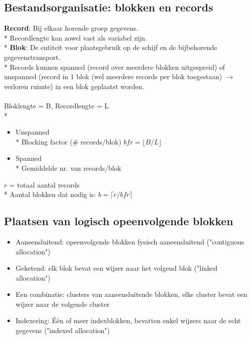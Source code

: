 \documentclass[10pt]{article}
\begin{document}
\subsection{Bestandsorganisatie: blokken en records}
\textbf{Record}: Bij elkaar horende groep gegevens.\\*
Recordlengte kan zowel vast als variabel zijn.\\*
\textbf{Blok}: De entiteit voor plaatsgebruik op de schijf en de bijbehorende gegevenstransport.\\*
Records kunnen spanned (record over meerdere blokken uitgespreid) of unspanned (record in 1 blok (wel meerdere records per blok toegestaan) $\rightarrow$ verloren ruimte) in een blok geplaatst worden.\\\\
Bloklengte = B, Recordlengte = L\\*
\begin{itemize}
\item Unspanned\\*
Blocking factor ($\#$ records/blok) $bfr = \lfloor B/L\rfloor$
\item Spanned\\*
Gemiddelde nr. van records/blok
\end{itemize}
$r$ = totaal aantal records\\*
Aantal blokken dat nodig is: $b = \lceil r/bfr\rceil$
\subsection{Plaatsen van logisch opeenvolgende blokken}
\begin{itemize}
\item Aaneensluitend: opeenvolgende blokken fysisch aaneensluitend ("contiguous allocation")
\item Geketend: elk blok bevat een wijzer naar het volgend blok ("linked allocation")
\item Een combinatie: clusters van aaneensluitende blokken, elke cluster bevat een wijzer naar de volgende cluster
\item Indexering: \'E\'en of meer indexblokken, bevatten enkel wijzers naar de echt gegevens ("indexed allocation")
\end{itemize}
\end{document}
